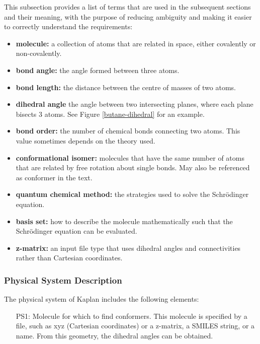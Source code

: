 \documentclass[12pt]{article}
\newcommand{\progname}{Kaplan} %
\begin{document}
This subsection provides a list of terms that are used in the subsequent
sections and their meaning, with the purpose of reducing ambiguity and making it
easier to correctly understand the requirements:

\begin{itemize}
\item \textbf{molecule:} a collection of atoms that are related in space, 
either covalently or non-covalently.
\item \textbf{bond angle:} the angle formed between three atoms.
\item \textbf{bond length:} the distance between the centre of masses of two 
atoms.
\item \textbf{dihedral angle} the angle between two intersecting planes, where 
each plane bisects 3 atoms. See Figure \ref{butane-dihedral} for an example.
\item \textbf{bond order:} the number of chemical bonds connecting two atoms. 
This value sometimes depends on the theory used.
\item \textbf{conformational isomer:} molecules that have the same number of 
atoms that are related by free rotation about single bonds. May also be 
referenced as conformer in the text. 
\item \textbf{quantum chemical method:} the strategies used to solve the 
Schr\"{o}dinger equation.
\item \textbf{basis set:} how to describe the molecule mathematically such that 
the Schr\"{o}dinger equation can be evaluated.
\item \textbf{z-matrix:} an input file type that uses dihedral angles and 
connectivities rather than Cartesian coordinates.
\end{itemize}

\subsubsection{Physical System Description}

The physical system of \progname{} includes the following elements:

\begin{itemize}

\item[PS1:] Molecule for which to find conformers. This molecule is specified 
by a file, such as xyz (Cartesian coordinates) or a 
z-matrix, a SMILES string, 
or a name. From this geometry, the dihedral angles can be obtained.

\end{itemize}
\end{document}
